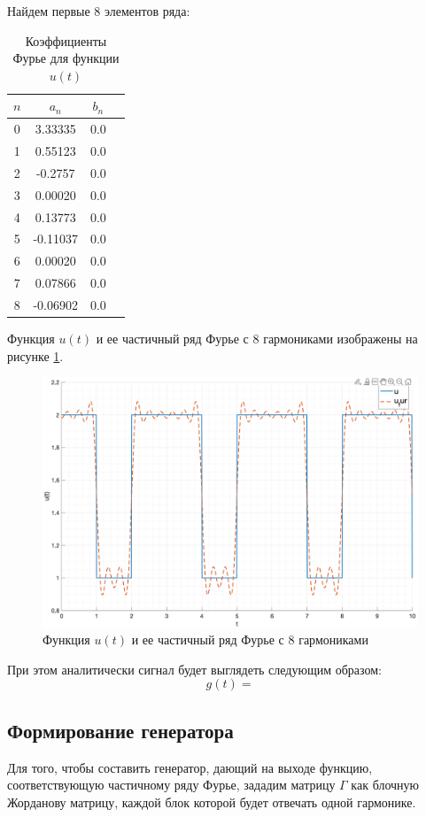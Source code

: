 Найдем первые 8 элементов ряда:
\begin{table}[ht!]
    \centering
    \begin{tabular}{|c|c|c|c|}
        \hline
        $n$ & $a_n$ & $b_n$ \\
        \hline
        0 & 3.33335 & 0.0 \\
        1 & 0.55123 & 0.0 \\
        2 & -0.2757 & 0.0 \\
        3 & 0.00020 & 0.0 \\
        4 & 0.13773 & 0.0 \\
        5 & -0.11037 & 0.0 \\
        6 & 0.00020 & 0.0 \\
        7 & 0.07866 & 0.0 \\
        8 & -0.06902 & 0.0 \\
        \hline
    \end{tabular}
    \caption{Коэффициенты Фурье для функции $u(t)$}
\end{table}

Функция $u(t)$ и ее частичный ряд Фурье с 8 гармониками изображены на рисунке \ref{fig:fourier}.
\begin{figure}[ht!]
    \centering
    \includegraphics[width=\textwidth]{media/plots/u_fourier.png}
    \caption{Функция $u(t)$ и ее частичный ряд Фурье с 8 гармониками}
    \label{fig:fourier}
\end{figure}

При этом аналитически сигнал будет выглядеть следующим образом:
\begin{equation}
    g(t) = 
\end{equation}

\subsection{Формирование генератора}
Для того, чтобы составить генератор, дающий на выходе функцию, соответствующую частичному ряду 
Фурье, зададим матрицу $\Gamma$ как блочную Жорданову матрицу, каждой блок которой будет отвечать 
одной гармонике. 
